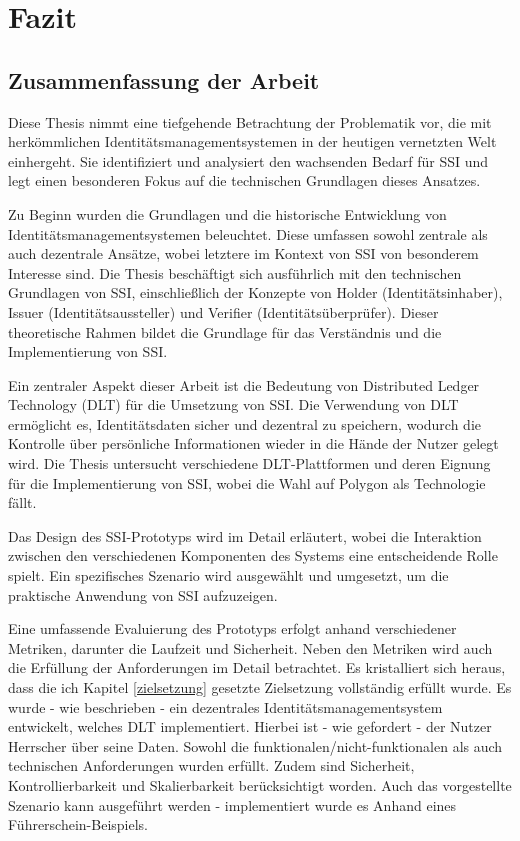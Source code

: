 \chapter{Fazit}
\label{cha:fazit}

\section{Zusammenfassung der Arbeit}
Diese Thesis nimmt eine tiefgehende Betrachtung der Problematik vor, die mit herkömmlichen Identitätsmanagementsystemen in der heutigen vernetzten Welt einhergeht. Sie identifiziert und analysiert den wachsenden Bedarf für SSI und legt einen besonderen Fokus auf die technischen Grundlagen dieses Ansatzes.

Zu Beginn wurden die Grundlagen und die historische Entwicklung von Identitätsmanagementsystemen beleuchtet. Diese umfassen sowohl zentrale als auch dezentrale Ansätze, wobei letztere im Kontext von SSI von besonderem Interesse sind. Die Thesis beschäftigt sich ausführlich mit den technischen Grundlagen von SSI, einschließlich der Konzepte von Holder (Identitätsinhaber), Issuer (Identitätsaussteller) und Verifier (Identitätsüberprüfer). Dieser theoretische Rahmen bildet die Grundlage für das Verständnis und die Implementierung von SSI.

Ein zentraler Aspekt dieser Arbeit ist die Bedeutung von Distributed Ledger Technology (DLT) für die Umsetzung von SSI. Die Verwendung von DLT ermöglicht es, Identitätsdaten sicher und dezentral zu speichern, wodurch die Kontrolle über persönliche Informationen wieder in die Hände der Nutzer gelegt wird. Die Thesis untersucht verschiedene DLT-Plattformen und deren Eignung für die Implementierung von SSI, wobei die Wahl auf Polygon als Technologie fällt.

Das Design des SSI-Prototyps wird im Detail erläutert, wobei die Interaktion zwischen den verschiedenen Komponenten des Systems eine entscheidende Rolle spielt. Ein spezifisches Szenario wird ausgewählt und umgesetzt, um die praktische Anwendung von SSI aufzuzeigen.

Eine umfassende Evaluierung des Prototyps erfolgt anhand verschiedener Metriken, darunter die Laufzeit und Sicherheit. Neben den Metriken wird auch die Erfüllung der Anforderungen im Detail betrachtet. Es kristalliert sich heraus, dass die ich Kapitel \ref{zielsetzung} gesetzte Zielsetzung vollständig erfüllt wurde. Es wurde - wie beschrieben - ein dezentrales Identitätsmanagementsystem entwickelt, welches DLT implementiert. Hierbei ist - wie gefordert - der Nutzer Herrscher über seine Daten. Sowohl die funktionalen/nicht-funktionalen als auch technischen Anforderungen wurden erfüllt. Zudem sind Sicherheit, Kontrollierbarkeit und Skalierbarkeit berücksichtigt worden. Auch das vorgestellte Szenario kann ausgeführt werden - implementiert wurde es Anhand eines Führerschein-Beispiels.

